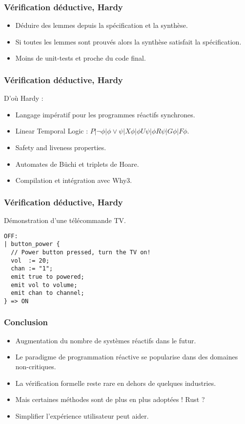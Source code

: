 \documentclass{beamer}
\begin{document}

\begin{frame}
\frametitle{Vérification déductive, Hardy}

\begin{itemize}
\item Déduire des lemmes depuis la spécification
      et la synthèse.
\item Si toutes les lemmes sont prouvés alors la
      synthèse satisfait la spécification.
\item Moins de unit-tests et proche du code final.
\end{itemize}
\end{frame}

\begin{frame}
\frametitle{Vérification déductive, Hardy}

D'où Hardy :

\begin{itemize}
\item Langage impératif pour les programmes
      réactifs synchrones.
\item Linear Temporal Logic :
      $P | \neg \phi | \phi \lor \psi
       | \mathit{X} \phi | \phi \mathit{U} \psi
       | \phi \mathit{R} \psi | \mathit{G} \phi
       | \mathit{F} \phi$.
\item Safety and liveness properties.
\item Automates de Büchi et triplets de Hoare.
\item Compilation et intégration avec Why3.
\end{itemize}
\end{frame}

\begin{frame}[fragile]
\frametitle{Vérification déductive, Hardy}

Démonstration d'une télécommande TV.

\begin{lstlisting}[language=Hardy]
OFF:
| button_power {
  // Power button pressed, turn the TV on!
  vol  := 20;
  chan := "1";
  emit true to powered;
  emit vol to volume;
  emit chan to channel;
} => ON
\end{lstlisting}
\end{frame}


\begin{frame}
\frametitle{Conclusion}

\begin{itemize}
\item Augmentation du nombre de systèmes réactifs
      dans le futur.
\item Le paradigme de programmation réactive se
      popularise dans des domaines non-critiques.
\item La vérification formelle reste rare en
      dehors de quelques industries.
\item Mais certaines méthodes sont de plus en plus
      adoptées ! Rust ?
\item Simplifier l'expérience utilisateur peut
      aider.
\end{itemize}
\end{frame}
\end{document}
